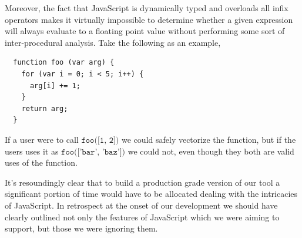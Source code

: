 \documentclass[conference]{IEEEtran}
\begin{document}
Moreover, the fact that JavaScript is dynamically typed and overloads all
infix operators makes it virtually impossible to determine whether a given
expression will always evaluate to a floating point value without performing
some sort of inter-procedural analysis. Take the following as an example,
\begin{verbatim}
  function foo (var arg) {
    for (var i = 0; i < 5; i++) {
      arg[i] += 1;
    }
    return arg;
  }
\end{verbatim}
If a user were to call $\texttt{foo([1, 2])}$ we could safely vectorize the
function, but if the users uses it as $\texttt{foo(['bar', 'baz'])}$ we could
not, even though they both are valid uses of the function.

It's resoundingly clear that to build a production grade version of our tool
a significant portion of time would have to be allocated dealing with the
intricacies of JavaScript. In retrospect at the onset of our development we
should have clearly outlined not only the features of JavaScript which we
were aiming to support, but those we were ignoring them.




%
%

\end{document}
